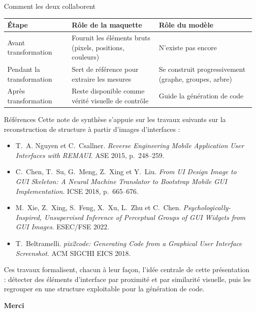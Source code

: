 \documentclass[11pt,aspectratio=169]{beamer}
\begin{document}
\begin{frame}{Comment les deux collaborent}
\small
\begin{tabularx}{\textwidth}{@{}lXX@{}}
\toprule
\textbf{Étape} & \textbf{Rôle de la maquette} & \textbf{Rôle du modèle} \\
\midrule
Avant transformation & Fournit les éléments bruts (pixels, positions, couleurs) & N'existe pas encore \\
\addlinespace
Pendant la transformation & Sert de référence pour extraire les mesures & Se construit progressivement (graphe, groupes, arbre) \\
\addlinespace
Après transformation & Reste disponible comme vérité visuelle de contrôle & Guide la génération de code \\
\bottomrule
\end{tabularx}
\end{frame}

\begin{frame}{Références}
\footnotesize
Cette note de synthèse s'appuie sur les travaux suivants sur la reconstruction de structure à partir d'images d'interfaces :

\vspace{0.3cm}
\begin{itemize}
    \item T.~A. Nguyen et C.~Csallner. \emph{Reverse Engineering Mobile Application User Interfaces with REMAUI}. ASE 2015, p.~248--259.
    \item C.~Chen, T.~Su, G.~Meng, Z.~Xing et Y.~Liu. \emph{From UI Design Image to GUI Skeleton: A Neural Machine Translator to Bootstrap Mobile GUI Implementation}. ICSE 2018, p.~665--676.
    \item M.~Xie, Z.~Xing, S.~Feng, X.~Xu, L.~Zhu et C.~Chen. \emph{Psychologically-Inspired, Unsupervised Inference of Perceptual Groups of GUI Widgets from GUI Images}. ESEC/FSE 2022.
    \item T.~Beltramelli. \emph{pix2code: Generating Code from a Graphical User Interface Screenshot}. ACM SIGCHI EICS 2018.
\end{itemize}

\vspace{0.3cm}
\normalsize
Ces travaux formalisent, chacun à leur façon, l'idée centrale de cette présentation : détecter des éléments d'interface par proximité et par similarité visuelle, puis les regrouper en une structure exploitable pour la génération de code.
\end{frame}

\begin{frame}
\centering
{\Large\color{navy}\textbf{Merci}}
\end{frame}
\end{document}
